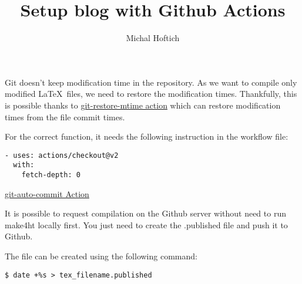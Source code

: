 \documentclass{article}
\title{Setup blog with Github Actions}
\author{Michal Hoftich}
\begin{document}
\maketitle

Git doesn't keep modification time in the repository. As we want to compile only modified
\LaTeX\ files, we need to restore the modification times. 
Thankfully, this is possible thanks to 
\href{https://github.com/chetan/git-restore-mtime-action}{git-restore-mtime action}
which can restore modification times from the file commit times.

For the correct function, it needs the following instruction in the workflow file:

\begin{verbatim}
- uses: actions/checkout@v2
  with:
    fetch-depth: 0
\end{verbatim}

\href{https://github.com/stefanzweifel/git-auto-commit-action}{git-auto-commit Action}

It is possible to request compilation on the Github server without need to run
make4ht locally first. You just need to create the .published file and push it to Github.

The file can be created using the following command:

\begin{verbatim}
$ date +%s > tex_filename.published
\end{verbatim}
\end{document}
